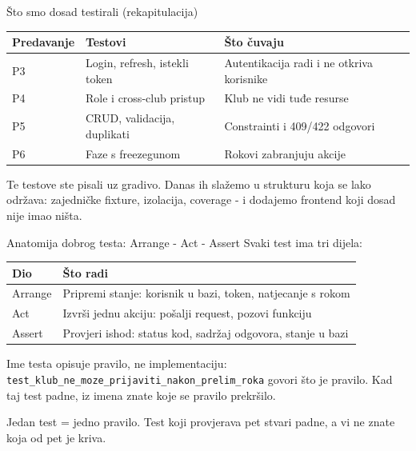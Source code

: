 \begin{frame}{Što smo dosad testirali (rekapitulacija)}
\begin{tabular}{@{}llp{5.5cm}@{}}
  \toprule
  \textbf{Predavanje} & \textbf{Testovi} & \textbf{Što čuvaju} \\
  \midrule
  P3 & Login, refresh, istekli token & Autentikacija radi i ne otkriva korisnike \\
  P4 & Role i cross-club pristup & Klub ne vidi tuđe resurse \\
  P5 & CRUD, validacija, duplikati & Constrainti i 409/422 odgovori \\
  P6 & Faze s freezegunom & Rokovi zabranjuju akcije \\
  \bottomrule
\end{tabular}

\vspace{0.6em}
Te testove ste pisali uz gradivo. Danas ih slažemo u strukturu koja se lako održava: zajedničke fixture, izolacija, coverage - i dodajemo frontend koji dosad nije imao ništa.
\end{frame}

\begin{frame}{Anatomija dobrog testa: Arrange - Act - Assert}
Svaki test ima tri dijela:

\vspace{0.4em}
\begin{tabular}{@{}lp{8.5cm}@{}}
  \toprule
  \textbf{Dio} & \textbf{Što radi} \\
  \midrule
  Arrange & Pripremi stanje: korisnik u bazi, token, natjecanje s rokom \\
  Act & Izvrši jednu akciju: pošalji request, pozovi funkciju \\
  Assert & Provjeri ishod: status kod, sadržaj odgovora, stanje u bazi \\
  \bottomrule
\end{tabular}

\vspace{0.6em}
Ime testa opisuje pravilo, ne implementaciju: \texttt{test\_klub\_ne\_moze\_prijaviti\_nakon\_prelim\_roka} govori što je pravilo. Kad taj test padne, iz imena znate koje se pravilo prekršilo.

\vspace{0.4em}
Jedan test = jedno pravilo. Test koji provjerava pet stvari padne, a vi ne znate koja od pet je kriva.
\end{frame}

